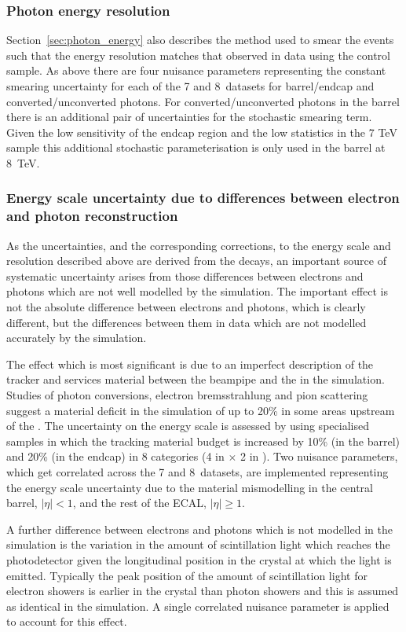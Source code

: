 \subsubsection{Photon energy resolution}
Section~\ref{sec:photon_energy} also describes the method used to smear the \MC events such that the energy resolution matches that observed in data using the \Zee control sample. As above there are four nuisance parameters representing the constant smearing uncertainty for each of the 7 and 8~\TeV datasets for barrel/endcap and converted/unconverted photons. For converted/unconverted photons in the barrel there is an additional pair of uncertainties for the stochastic smearing term. Given the low sensitivity of the endcap region and the low statistics in the 7 TeV sample this additional stochastic parameterisation is only used in the barrel at 8~TeV.

\subsubsection{Energy scale uncertainty due to differences between electron and photon reconstruction}
As the uncertainties, and the corresponding corrections, to the energy scale and resolution described above are derived from the \Zee decays, an important source of systematic uncertainty arises from those differences between electrons and photons which are not well modelled by the \MC simulation. The important effect is not the absolute difference between electrons and photons, which is clearly different, but the differences between them in data which are not modelled accurately by the simulation. 

The effect which is most significant is due to an imperfect description of the tracker and services material between the beampipe and the \ECAL in the simulation. Studies of photon conversions, electron bremsstrahlung and pion scattering suggest a material deficit in the simulation of up to 20\% in some areas upstream of the \ECAL. The uncertainty on the energy scale is assessed by using specialised \MC samples in which the tracking material budget is increased by 10\% (in the barrel) and 20\% (in the endcap) in 8 categories (4 in \eta $\times$ 2 in \rnine). Two nuisance parameters, which get correlated across the 7 and 8~\TeV datasets, are implemented representing the energy scale uncertainty due to the material mismodelling in the central barrel, $|\eta|<1$, and the rest of the ECAL, $|\eta|\geq1$.

A further difference between electrons and photons which is not modelled in the simulation is the variation in the amount of scintillation light which reaches the photodetector given the longitudinal position in the crystal at which the light is emitted. Typically the peak position of the amount of scintillation light for electron showers is earlier in the crystal than photon showers and this is assumed as identical in the simulation. A single correlated nuisance parameter is applied to account for this effect.

